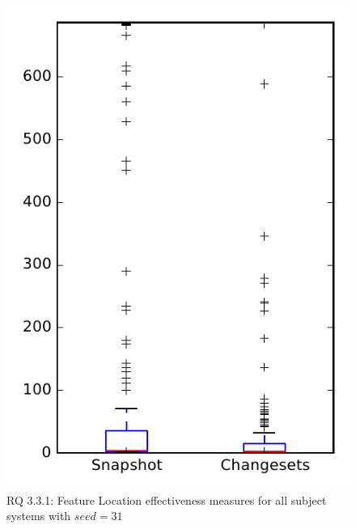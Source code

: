 
\begin{figure}
\centering
\includegraphics[height=0.4\textheight]{figures/flt_seed/rq1_overview_31}
\caption{RQ 3.3.1: Feature Location effectiveness measures for all subject systems with $seed=31$}
\label{fig:flt_seed:rq1:overview}
\end{figure}

